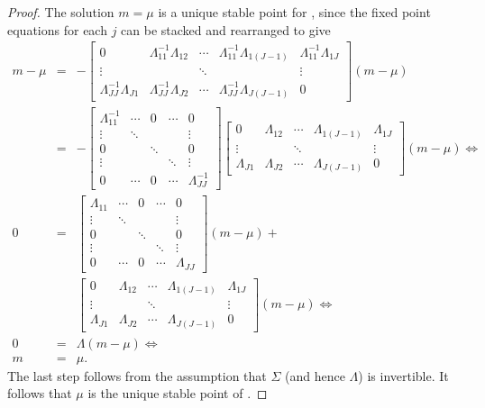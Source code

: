 \begin{proof}
The solution $m = \mu$ is a unique stable point for , since
the fixed point equations for each $j$ can be stacked and rearranged to give
%
\begin{eqnarray*}
m-\mu & = & -\left[\begin{array}{ccccc}
0 & \Lambda_{11}^{-1}\Lambda_{12} & \cdots & \Lambda_{11}^{-1}\Lambda_{1\left(J-1\right)} & \Lambda_{11}^{-1}\Lambda_{1J}\\
\vdots &  & \ddots &  & \vdots\\
\Lambda_{JJ}^{-1}\Lambda_{J1} & \Lambda_{JJ}^{-1}\Lambda_{J2} & \cdots & \Lambda_{JJ}^{-1}\Lambda_{J\left(J-1\right)} & 0
\end{array}\right]\left(m-\mu\right)\\
 & = & -\left[\begin{array}{ccccc}
\Lambda_{11}^{-1} & \cdots & 0 & \cdots & 0\\
\vdots & \ddots &  &  & \vdots\\
0 &  & \ddots &  & 0\\
\vdots &  &  & \ddots & \vdots\\
0 & \cdots & 0 & \cdots & \Lambda_{JJ}^{-1}
\end{array}\right]\left[\begin{array}{ccccc}
0 & \Lambda_{12} & \cdots & \Lambda_{1\left(J-1\right)} & \Lambda_{1J}\\
\vdots &  & \ddots &  & \vdots\\
\Lambda_{J1} & \Lambda_{J2} & \cdots & \Lambda_{J\left(J-1\right)} & 0
\end{array}\right]\left(m-\mu\right)\Leftrightarrow\\
0 & = & \left[\begin{array}{ccccc}
\Lambda_{11} & \cdots & 0 & \cdots & 0\\
\vdots & \ddots &  &  & \vdots\\
0 &  & \ddots &  & 0\\
\vdots &  &  & \ddots & \vdots\\
0 & \cdots & 0 & \cdots & \Lambda_{JJ}
\end{array}\right]\left(m-\mu\right) +\\
&& \left[\begin{array}{ccccc}
0 & \Lambda_{12} & \cdots & \Lambda_{1\left(J-1\right)} & \Lambda_{1J}\\
\vdots &  & \ddots &  & \vdots\\
\Lambda_{J1} & \Lambda_{J2} & \cdots & \Lambda_{J\left(J-1\right)} & 0
\end{array}\right]\left(m-\mu\right)\Leftrightarrow\\
0 & = & \Lambda \left(m-\mu\right) \Leftrightarrow\\
m & = & \mu.
\end{eqnarray*}
%
The last step follows from the assumption that $\Sigma$ (and hence $\Lambda$)
is invertible.  It follows that $\mu$ is the unique stable point of
.

\end{proof}


